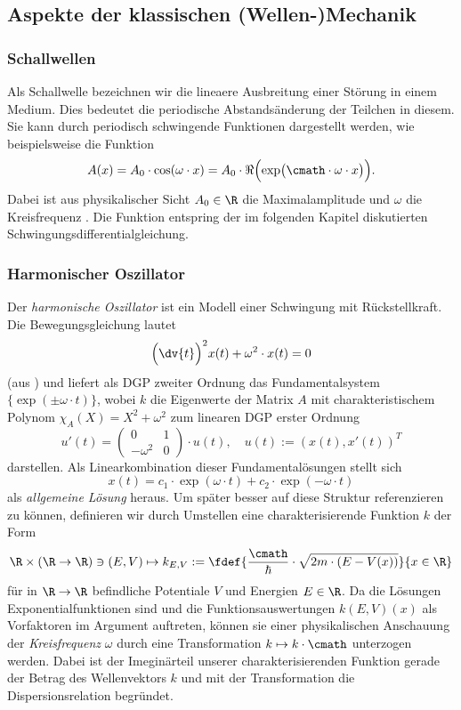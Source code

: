 \documentclass[../main.tex]{subfiles}
\begin{document}
    \subsection{Aspekte der klassischen (Wellen-)Mechanik}
        \subsubsection{Schallwellen}
            Als Schallwelle bezeichnen wir die lineaere Ausbreitung einer Störung in einem Medium. Dies bedeutet die periodische Abstandsänderung der Teilchen in diesem. Sie kann durch periodisch schwingende Funktionen dargestellt werden, wie beispielsweise die Funktion 
            \[
                A(x) = A_0\cdot \cos(\omega\cdot x) = A_0\cdot\Re\Big({\exp}\big(\cmath\cdot\omega\cdot x\big)\Big).
            \]
            Dabei ist aus physikalischer Sicht $A_0\in\R$ die Maximalamplitude und $\omega$ die Kreisfrequenz \cite[p.199]{nolting1}. Die Funktion entspring der im folgenden Kapitel diskutierten Schwingungsdifferentialgleichung. 

        \subsubsection{Harmonischer Oszillator}
            Der \emph{harmonische Oszillator} ist ein Modell einer Schwingung mit Rückstellkraft. Die Bewegungsgleichung lautet
            \[
                \Bigl(\dv{t}\Bigr)^2x(t) + \omega^2\cdot x(t) = 0
            \]
            (aus \cite[p.307]{nolting51}) und liefert als DGP zweiter Ordnung das Fundamentalsystem $\{\exp(\pm\omega\cdot t)\}$, wobei $k$ die Eigenwerte der Matrix $A$ mit charakteristischem Polynom $\chi_A(X) = X^2 + \omega^2$ zum linearen DGP erster Ordnung
            \[
                u'(t) = \begin{pmatrix}
                    0 & 1\\
                    -\omega^2 & 0
                \end{pmatrix}\cdot u(t),\quad u(t):=(x(t), x'(t))^T
            \]
            darstellen. Als Linearkombination dieser Fundamentalösungen stellt sich 
            \[
                x(t) = c_1\cdot\exp(\omega\cdot t) + c_2\cdot\exp(-\omega\cdot t)   
            \]
            als \emph{allgemeine Lösung} heraus. Um später besser auf diese Struktur referenzieren zu können, definieren wir durch Umstellen eine charakterisierende Funktion $k$ der Form
            \[
                \R\times(\R\to\R)\ni(E,V)\mapsto k_{E,V}:=\fdef{\frac{\cmath}{\hbar}\cdot\sqrt{2m\cdot(E - V(x))}}{x\in\R}
            \] 
            für in $\R\to\R$ befindliche Potentiale $V$ und Energien $E\in\R$. Da die Lösungen Exponentialfunktionen sind und die Funktionsauswertungen $k(E,V)(x)$ als Vorfaktoren im Argument auftreten, können sie einer physikalischen Anschauung der \emph{Kreisfrequenz} $\omega$ durch eine Transformation $k\mapsto k\cdot\cmath$ unterzogen werden. Dabei ist der Imeginärteil unserer charakterisierenden Funktion gerade der Betrag des Wellenvektors $k$ und mit der Transformation die Dispersionsrelation begründet. 
            
\end{document}
